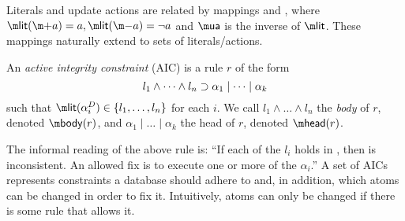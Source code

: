 Literals and update actions are related by mappings \litof and \actof, where $\litof(\add a)= a, \litof(\remove a) = \lnot a$ and $\actof$ is the inverse of $\litof$.
These mappings naturally extend to sets of literals/actions. 

\begin{definition}
 An \emph{active integrity constraint} (AIC) is a rule $r$ of the form
  \begin{equation} l_1\land \dots\land l_n\supset \alpha_1\mid\dots \mid \alpha_k \label{eq:aic}\end{equation}
  such that $\litof(\alpha_i^D) \in \{l_1,\dots,l_n\}$ for each $i$.
%  
  We call $l_1\land \dots \land l_n$ the \emph{body} of $r$, denoted $\body(r)$, and $\alpha_1\mid\dots \mid \alpha_k$ the head of $r$, denoted $\head (r)$.
\end{definition}

The informal reading of the above rule is: ``If each of the $l_i$ holds in \db, then \db is inconsistent. An allowed fix is to execute one or more of the $\alpha_i$.''
A set of AICs represents constraints a database should adhere to and, in addition, which atoms can be changed in order to fix it. Intuitively, atoms can only be changed if there is some rule that allows it. 


